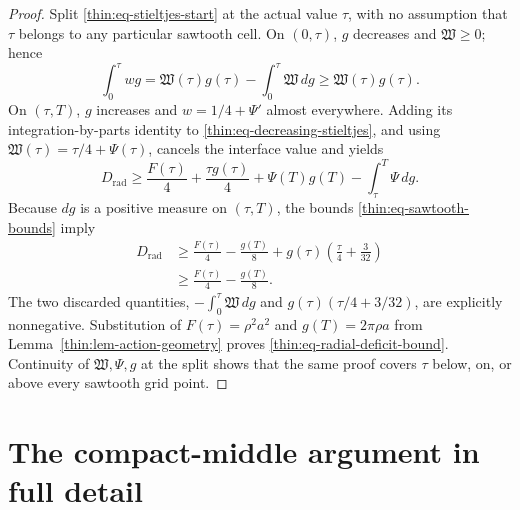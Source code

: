 \documentclass[11pt]{article}
\numberwithin{equation}{section}
\theoremstyle{definition}
\theoremstyle{remark}
\begin{document}
\begin{proof}
Split \eqref{thin:eq-stieltjes-start} at the actual value \(\tau\), with
no assumption that \(\tau\) belongs to any particular sawtooth cell.  On
\((0,\tau)\), \(g\) decreases and \(\mathfrak W\geq0\); hence
\begin{equation}
  \int_0^\tau wg
  =\mathfrak W(\tau)g(\tau)-\int_0^\tau \mathfrak W\,dg
  \geq \mathfrak W(\tau)g(\tau).
  \label{thin:eq-decreasing-stieltjes}
\end{equation}
On \((\tau,T)\), \(g\) increases and \(w=1/4+\Psi'\) almost everywhere.
Adding its integration-by-parts identity to
\eqref{thin:eq-decreasing-stieltjes}, and using
\(\mathfrak W(\tau)=\tau/4+\Psi(\tau)\), cancels the interface value and
yields
\[
  D_{\mathrm{rad}}
  \geq \frac{F(\tau)}4+\frac{\tau g(\tau)}4
     +\Psi(T)g(T)-\int_\tau^T\Psi\,dg.
\]
Because \(dg\) is a positive measure on \((\tau,T)\), the bounds
\eqref{thin:eq-sawtooth-bounds} imply
\[
\begin{aligned}
  D_{\mathrm{rad}}
  &\geq \frac{F(\tau)}4-\frac{g(T)}8
    +g(\tau)\left(\frac\tau4+\frac3{32}\right) \\
  &\geq \frac{F(\tau)}4-\frac{g(T)}8.
\end{aligned}
\]
The two discarded quantities,
\(-\int_0^\tau \mathfrak W\,dg\) and
\(g(\tau)(\tau/4+3/32)\), are explicitly nonnegative.  Substitution of
\(F(\tau)=\rho^2a^2\) and \(g(T)=2\pi\rho a\) from
Lemma~\ref{thin:lem-action-geometry} proves
\eqref{thin:eq-radial-deficit-bound}.  Continuity of
\(\mathfrak W,\Psi,g\) at the
split shows that the same proof covers \(\tau\) below, on, or above every
sawtooth grid point.
\end{proof}


\iffalse
\section{The compact-middle argument in full detail}
\label{cm:sec-full}
\end{document}
